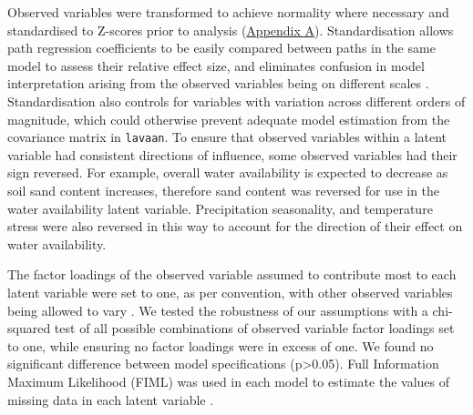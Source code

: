 \documentclass[11pt,a4paper]{article}
\begin{document}
Observed variables were transformed to achieve normality where necessary and standardised to Z-scores prior to analysis (\hyperref[appendixa]{Appendix A}). Standardisation allows path regression coefficients to be easily compared between paths in the same model to assess their relative effect size, and eliminates confusion in model interpretation arising from the observed variables being on different scales \citep{Beaujean2014}. Standardisation also controls for variables with variation across different orders of magnitude, which could otherwise prevent adequate model estimation from the covariance matrix in \verb|lavaan|. To ensure that observed variables within a latent variable had consistent directions of influence, some observed variables had their sign reversed. For example, overall water availability is expected to decrease as soil sand content increases, therefore sand content was reversed for use in the water availability latent variable. Precipitation seasonality, and temperature stress were also reversed in this way to account for the direction of their effect on water availability. 

The factor loadings of the observed variable assumed to contribute most to each latent variable were set to one, as per convention, with other observed variables being allowed to vary \citep{Beaujean2014}.  We tested the robustness of our assumptions with a chi-squared test of all possible combinations of observed variable factor loadings set to one, while ensuring no factor loadings were in excess of one. We found no significant difference between model specifications (p>0.05). Full Information Maximum Likelihood (FIML) was used in each model to estimate the values of missing data in each latent variable \citep{Cham2017}.
\end{document}
